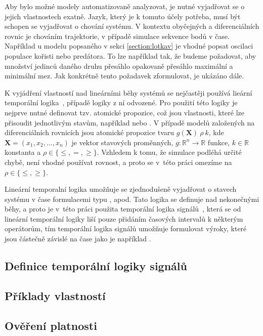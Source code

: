 Aby bylo možné modely automatizovaně analyzovat, je nutné vyjadřovat se o jejich
vlastnostech exatně. Jazyk, který je k tomuto účely potřeba, musí být schopen se
vyjadřovat o chování systému. V kontextu obyčejných a diferenciálních rovnic je
chováním trajektorie, v případě simulace sekvence bodů v čase. Například u modelu
popsaného v sekci \ref{section:lotkav} je vhodné popsat oscilaci populace kořisti
nebo predátora. To lze například tak, že budeme požadovat, aby množství jedinců
daného druhu přesáhlo opakovaně pře\-sáh\-lo maximální a minimální mez. Jak konkrétně
tento požadavek zformulovat, je ukázáno dále.

K vyjádření vlastností nad lineárními běhy systémů se nejčastěji používá lieární
temporální logika~\cite{strejcek2007}, případě logiky z ní odvozené. Pro použití této logiky je nejprve
nutné definovat tzv. atomické propozice, což jsou vlastnosti, které lze přisoudit jednotlivým stavům,
například  nebo .
V případě modelů založených na diferenciálních rovnicích jsou atomické propozice tvaru $g(\mathbf{X})~\rho~k$,
kde $\mathbf{X} = (x_1, x_2, \ldots, x_n)$ je vektor stavových proměnných,
$g: \mathbb{R}^n \rightarrow \mathbb{R}$ funkce,
$k\in\mathbb{R}$ konstanta a $\rho \in \{\leq, =, \geq\}$. Vzhledem k tomu,
že simulace podléhá určité chybě, není vhodné používat rovnost, a proto se v~této
práci omezíme na $\rho \in \{\leq, \geq\}$.

Lineární temporalní logika u\-mož\-ňu\-je se zjednodušeně vyjadřovat o sta\-vech
systému v čase formulacemi typu ,  apod.
Tato logika se definuje nad nekonečnými běhy, a proto je v~této práci použita temporální logika
signálů~\cite{maler2004}, která se od lineární temporální logiky liší pouze přidáním
časových intervalů k některým ope\-rá\-to\-rům, tím temporální logika signálů umožňuje
formulovat výroky, které jsou částečně závislé na čase jako je například  
.	

\subsection{Definice temporální logiky signálů}



\subsection{Příklady vlastností}

\subsection{Ověření platnosti}
